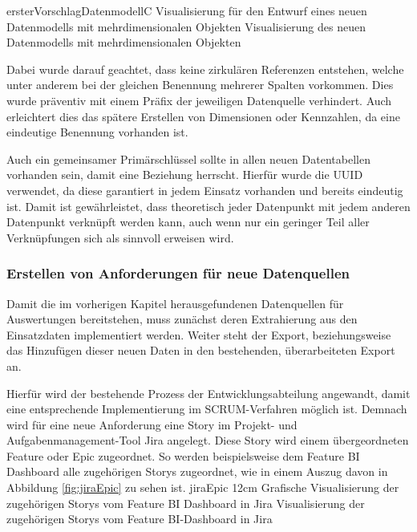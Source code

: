 \bildbreit
{ersterVorschlagDatenmodellC}
{Visualisierung für den Entwurf eines neuen Datenmodells mit mehrdimensionalen Objekten}
{Visualisierung des neuen Datenmodells mit mehrdimensionalen Objekten}

Dabei wurde darauf geachtet, dass keine zirkulären Referenzen entstehen, welche unter anderem bei der gleichen Benennung mehrerer Spalten vorkommen.
Dies wurde präventiv mit einem Präfix der jeweiligen Datenquelle verhindert.
Auch erleichtert dies das spätere Erstellen von Dimensionen oder Kennzahlen, da eine eindeutige Benennung vorhanden ist.

Auch ein gemeinsamer Primärschlüssel sollte in allen neuen Datentabellen vorhanden sein, damit eine Beziehung herrscht.
Hierfür wurde die \gls{UUID} verwendet, da diese garantiert in jedem Einsatz vorhanden und bereits eindeutig ist.
Damit ist gewährleistet, dass theoretisch jeder Datenpunkt mit jedem anderen Datenpunkt verknüpft werden kann, auch wenn nur ein geringer Teil aller Verknüpfungen sich als sinnvoll erweisen wird. 


\subsubsection{Erstellen von Anforderungen für neue Datenquellen} %
\label{subsub:stories}
Damit die im vorherigen Kapitel herausgefundenen Datenquellen für Auswertungen bereitstehen, muss zunächst deren Extrahierung aus den Einsatzdaten implementiert werden. 
Weiter steht der Export, beziehungsweise das Hinzufügen dieser neuen Daten in den bestehenden, überarbeiteten Export an.

Hierfür wird der bestehende Prozess der Entwicklungsabteilung angewandt, damit eine entsprechende Implementierung im SCRUM-Verfahren möglich ist.
Demnach wird für eine neue Anforderung eine \glqq Story\grqq{} im Projekt- und Aufgabenmanagement-Tool \glqq Jira\grqq{} angelegt.
Diese Story wird einem übergeordneten \gls{Feature} oder \glqq Epic\grqq{} zugeordnet.
So werden beispielsweise dem Feature \glqq \gls{BI} Dashboard\grqq{} alle zugehörigen Storys zugeordnet, wie in einem Auszug davon in Abbildung \ref{fig:jiraEpic} zu sehen ist.
\bild
{jiraEpic}
{12cm}
{Grafische Visualisierung der zugehörigen Storys vom Feature \glqq \gls{BI} Dashboard\grqq{} in Jira}
{Visualisierung der zugehörigen Storys vom Feature BI-Dashboard in Jira}

